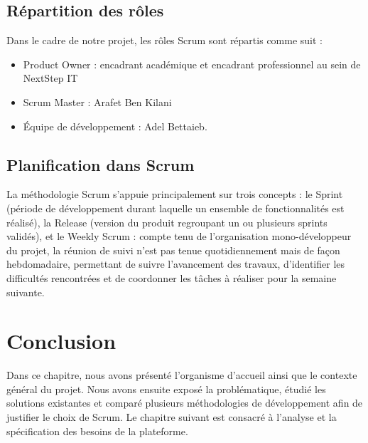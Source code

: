 \subsection*{Répartition des rôles}

Dans le cadre de notre projet, les rôles Scrum sont répartis comme suit :
\begin{itemize}
    \item Product Owner : encadrant académique et encadrant professionnel au sein de NextStep IT 
    \item Scrum Master : Arafet Ben Kilani 
    \item Équipe de développement : Adel Bettaieb.
\end{itemize}

\subsection*{Planification dans Scrum}

La méthodologie Scrum s'appuie principalement sur trois concepts : le Sprint (période de développement durant laquelle un ensemble de fonctionnalités est réalisé), la Release (version du produit regroupant un ou plusieurs sprints validés), et le Weekly Scrum : compte tenu de l'organisation mono-développeur du projet, la réunion de suivi n'est pas tenue quotidiennement mais de façon hebdomadaire, permettant de suivre l'avancement des travaux, d'identifier les difficultés rencontrées et de coordonner les tâches à réaliser pour la semaine suivante.

\section{Conclusion}

Dans ce chapitre, nous avons présenté l'organisme d'accueil ainsi que le contexte général du projet. Nous avons ensuite exposé la problématique, étudié les solutions existantes et comparé plusieurs méthodologies de développement afin de justifier le choix de Scrum. Le chapitre suivant est consacré à l'analyse et la spécification des besoins de la plateforme.
